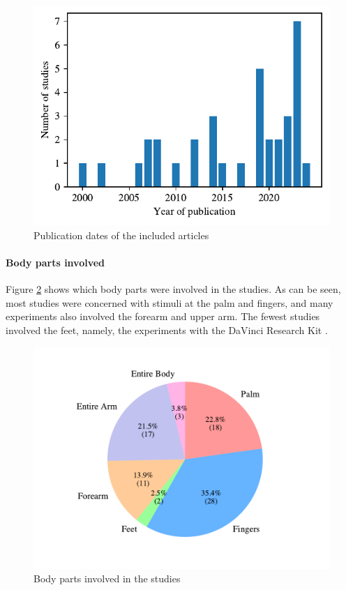 \begin{figure}[htbp]
    \centering
    \includegraphics[width=\columnwidth]{figures/years.pdf} 
    \caption{Publication dates of the included articles}
    \label{fig:years}
\end{figure} 


\paragraph{Body parts involved}

Figure \ref{fig:body_parts_pie} shows which body parts were involved in the studies. As can be seen, most studies were concerned with stimuli at the palm and fingers, and many experiments also involved the forearm and upper arm. The fewest studies involved the feet, namely, the experiments with the DaVinci Research Kit \cite{Caccianiga2021, Oquendo2024}.

\begin{figure}[htbp]
    \centering
    \includegraphics[width=\columnwidth]{figures/body_pie.pdf} 
    \caption{Body parts involved in the studies}
    \label{fig:body_parts_pie}
\end{figure} 


